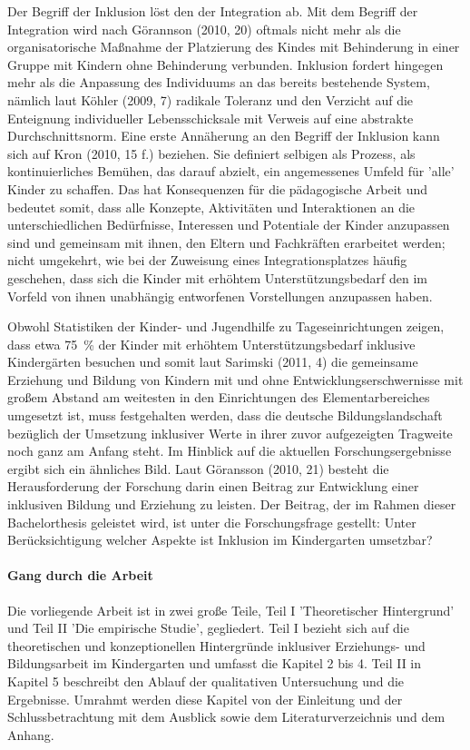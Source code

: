 Der Begriff der Inklusion löst den der Integration ab. Mit dem Begriff der Integration wird nach Görannson (2010, 20) oftmals nicht mehr als die organisatorische Maßnahme der Platzierung des Kindes mit Behinderung in einer Gruppe mit Kindern ohne Behinderung verbunden. Inklusion fordert hingegen mehr als die Anpassung des Individuums an das bereits bestehende System, nämlich laut Köhler (2009, 7) radikale Toleranz und den Verzicht auf die Enteignung individueller Lebensschicksale mit Verweis auf eine abstrakte Durchschnittsnorm. Eine erste Annäherung an den Begriff der Inklusion kann sich auf Kron (2010, 15 f.) beziehen. Sie definiert selbigen als Prozess, als kontinuierliches Bemühen, das darauf abzielt, ein angemessenes Umfeld für ’alle’ Kinder zu schaffen. Das hat Konsequenzen für die pädagogische Arbeit und bedeutet somit, dass alle Konzepte, Aktivitäten und Interaktionen an die unterschiedlichen Bedürfnisse, Interessen und Potentiale der Kinder anzupassen sind und gemeinsam mit ihnen, den Eltern und Fachkräften erarbeitet werden; nicht umgekehrt, wie bei der Zuweisung eines Integrationsplatzes häufig geschehen, dass sich die Kinder mit erhöhtem Unterstützungsbedarf den im Vorfeld von ihnen unabhängig entworfenen Vorstellungen anzupassen haben.  

Obwohl Statistiken der Kinder- und Jugendhilfe zu Tageseinrichtungen zeigen, dass etwa 75~\% der Kinder mit erhöhtem Unterstützungsbedarf  inklusive Kindergärten besuchen und somit laut Sarimski (2011, 4) die gemeinsame Erziehung und Bildung von Kindern mit und ohne Entwicklungserschwernisse mit großem Abstand am weitesten in den Einrichtungen des Elementarbereiches umgesetzt ist, muss festgehalten werden, dass die deutsche Bildungslandschaft bezüglich der Umsetzung inklusiver Werte in ihrer zuvor aufgezeigten Tragweite noch ganz am Anfang steht. Im Hinblick auf die aktuellen Forschungsergebnisse ergibt sich ein ähnliches Bild. Laut Göransson (2010, 21) besteht die Herausforderung der Forschung darin einen Beitrag zur Entwicklung einer inklusiven Bildung und Erziehung zu leisten. Der Beitrag, der im Rahmen dieser Bachelorthesis geleistet wird, ist unter die Forschungsfrage gestellt: Unter Berücksichtigung welcher Aspekte ist Inklusion im Kindergarten umsetzbar?

\paragraph{Gang durch die Arbeit} 
Die vorliegende Arbeit ist in zwei große Teile, Teil I 'Theoretischer Hintergrund' und Teil II 'Die empirische Studie', gegliedert. Teil I bezieht sich auf die theoretischen und konzeptionellen Hintergründe inklusiver Erziehungs- und Bildungsarbeit im Kindergarten und umfasst die Kapitel 2 bis 4. Teil II in Kapitel 5 beschreibt den Ablauf der qualitativen Untersuchung und die Ergebnisse. Umrahmt werden diese Kapitel von der Einleitung und der Schlussbetrachtung mit dem Ausblick sowie dem Literaturverzeichnis und dem Anhang.

